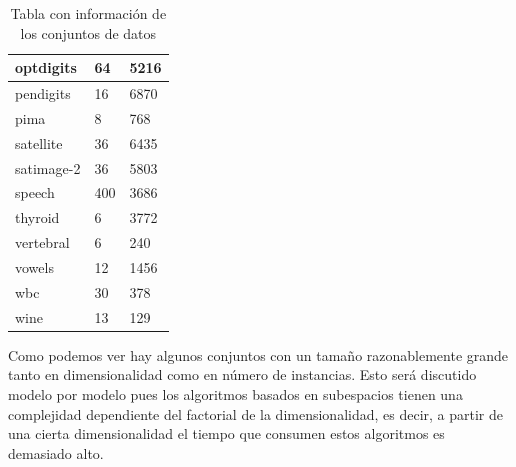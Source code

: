 \begin{table}[H]
\begin{tabular}{|l|l|l|}
		optdigits                                   & 64                                                  & 5216                                                     \\ \hline
		pendigits                                   & 16                                                  & 6870                                                     \\ \hline
		pima                                        & 8                                                   & 768                                                      \\ \hline
		satellite                                   & 36                                                  & 6435                                                     \\ \hline
		satimage-2                                  & 36                                                  & 5803                                                     \\ \hline
		speech                                      & 400                                                 & 3686                                                     \\ \hline
		thyroid                                     & 6                                                   & 3772                                                     \\ \hline
		vertebral                                   & 6                                                   & 240                                                      \\ \hline
		vowels                                      & 12                                                  & 1456                                                     \\ \hline
		wbc                                         & 30                                                  & 378                                                      \\ \hline
		wine                                        & 13                                                  & 129                                                      \\ \hline
	\end{tabular}
	\caption{Tabla con información de los conjuntos de datos}
\end{table}

Como podemos ver hay algunos conjuntos con un tamaño razonablemente grande tanto en dimensionalidad como en número de instancias. Esto será discutido modelo por modelo pues los algoritmos basados en subespacios tienen una complejidad dependiente del factorial de la dimensionalidad, es decir, a partir de una cierta dimensionalidad el tiempo que consumen estos algoritmos es demasiado alto.


